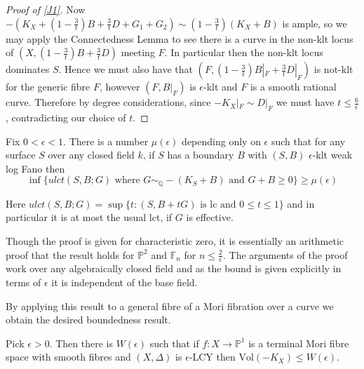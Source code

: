 \documentclass[a4paper,12pt]{book}
\newcommand{\Vol}{\text{Vol}}
\begin{document}
\begin{proof}[Proof of \autoref{J1}]
	Now $-(K_{X}+(1-\frac{3}{t})B+\frac{3}{t}D+G_{1}+G_{2}) \sim (1-\frac{3}{t})(K_{X}+B)$ is ample, so we may apply the Connectedness Lemma to see there is a curve in the non-klt locus of $(X,(1-\frac{3}{t})B+\frac{3}{t}D)$ meeting $F$. In particular then the non-klt locus dominates $S$. Hence we must also have that $(F,(1-\frac{3}{t})B|_{F}+\frac{3}{t}D|_{F})$ is not-klt for the generic fibre $F$, however $(F,B|_{F})$ is $\epsilon$-klt and $F$ is a smooth rational curve. Therefore by degree considerations, since $-K_{X}|_{F} \sim D|_{F}$ we must have $t \leq \frac{6}{\epsilon}$, contradicting our choice of $t$. 
\end{proof}

\begin{theorem}\label{aj}\cite[Theorem 2.8]{jiang2014boundedness}
	Fix $0<\epsilon<1$. There is a number $\mu(\epsilon)$ depending only on $\epsilon$ such that for any surface $S$ over any closed field $k$, if $S$ has a boundary $B$ with $(S,B)$ $\epsilon$-klt weak log Fano then \[\inf \{ulct (S,B;G) \text{ where } G \sim_{\mathbb{Q}}-(K_{S}+B) \text{ and } G+B \geq 0\}\geq \mu(\epsilon)\]
\end{theorem}

Here $ulct (S,B;G)= \sup\{t\colon  (S,B+tG) \text{ is lc and } 0 \leq t \leq 1\}$ and in particular it is at most the usual lct, if $G$ is effective.

Though the proof is given for characteristic zero, it is essentially an arithmetic proof that the result holds for $\mathbb{P}^{2}$ and $\mathbb{F}_{n}$ for $n \leq \frac{2}{\epsilon}$. The arguments of the proof work over any algebraically closed field and as the bound is given explicitly in terms of $\epsilon$ it is independent of the base field.

By applying this result to a general fibre of a Mori fibration over a curve we obtain the desired boundedness result.

\begin{theorem}\label{J2}
	Pick $\epsilon>0$. Then there is $W(\epsilon)$ such that if $f\colon X \to \mathbb{P}^{1}$ is a terminal Mori fibre space with smooth fibres and $(X,\Delta)$ is $\epsilon$-LCY then $\Vol(-K_{X})\leq W(\epsilon)$.
\end{theorem}
\end{document}
